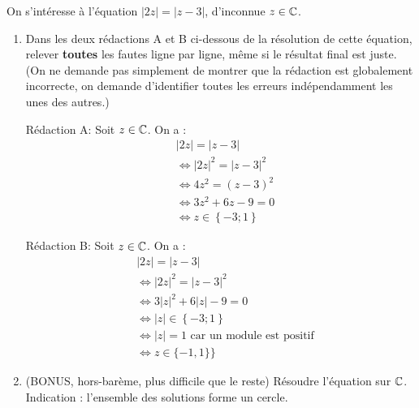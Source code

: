 \begin{exo}
On s'intéresse à l'équation $|2z| = |z-3|$, d'inconnue $z\in\mathbb{C}$. 
\begin{enumerate}
\item Dans les deux rédactions A et B  ci-dessous de la résolution de cette équation, relever \textbf{toutes} les fautes ligne par ligne, même si le résultat final est juste. (On ne demande pas simplement de montrer que la rédaction est globalement incorrecte, on demande d'identifier toutes les erreurs indépendamment les unes des autres.)
\begin{mdframed}
\begin{multicols}{2}
Rédaction A: Soit $z\in \mathbb{C}$. On a :  
\begin{align*}
 &|2z| = |z-3|\\
&\iff |2z|^2 = |z-3|^2\\
&\iff 4z^2 = (z-3)^2\\
&\iff 3z^2+6z-9=0\\
&\iff z\in \left\{-3;1\right\}
\end{align*}

\columnbreak
Rédaction B: Soit $z\in \mathbb{C}$. On a  : 
\begin{align*}
& |2z| = |z-3|\\
&\iff |2z|^2 = |z-3|^2\\
&\iff 3|z|^2+6|z|-9=0\\
&\iff |z|\in \left\{-3;1\right\}\\
&\iff |z|=1 \text{ car un module est positif}\\
&\iff z\in\{-1,1\} \}
\end{align*}
\end{multicols}
\end{mdframed}
\item (BONUS, hors-barème, plus difficile que le reste) Résoudre l'équation sur $\mathbb{C}$. Indication : l'ensemble des solutions forme un cercle.
\end{enumerate}


\end{exo}
